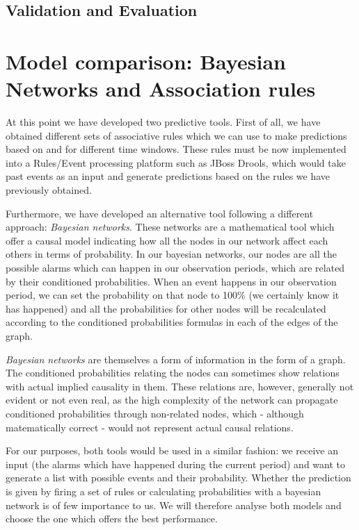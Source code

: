 \documentclass[a4paper,12pt]{article}
\begin{document}
\subsection{Validation and Evaluation}
\section{Model comparison: Bayesian Networks and Association rules}
\label{sec:model_comparison}

At this point we have developed two predictive tools. First of all, we have obtained different sets of associative rules which we can use to make predictions based on and for different time windows. These rules must be now implemented into a Rules/Event processing platform such as JBoss Drools, which would take past events as an input and generate predictions based on the rules we have previously obtained.

Furthermore, we have developed an alternative tool following a different approach: \emph{Bayesian networks}. These networks are a mathematical tool which offer a causal model indicating how all the nodes in our network affect each others in terms of probability. In our bayesian networks, our nodes are all the possible alarms which can happen in our observation periods, which are related by their conditioned probabilities. When an event happens in our observation period, we can set the probability on that node to 100\% (we certainly know it has happened) and all the probabilities for other nodes will be recalculated according to the conditioned probabilities formulas in each of the edges of the graph.

\emph{Bayesian networks} are themselves a form of information in the form of a graph. The conditioned probabilities relating the nodes can sometimes show relations with actual implied causality in them. These relations are, however, generally not evident or not even real, as the high complexity of the network can propagate conditioned probabilities through non-related nodes, which - although matematically correct - would not represent actual causal relations.

For our purposes, both tools would be used in a similar fashion: we receive an input (the alarms which have happened during the current period) and want to generate a list with possible events and their probability. Whether the prediction is given by firing a set of rules or calculating probabilities with a bayesian network is of few importance to us. We will therefore analyse both models and choose the one which offers the best performance.
\end{document}

